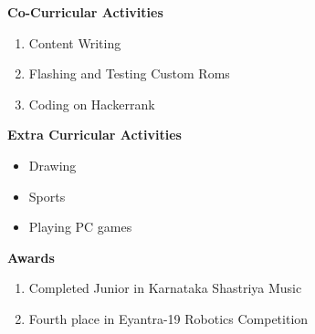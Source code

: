 \documentclass[12pt]{article}
\begin{document}
\vspace{0.1cm}
{\fontsize{14pt}{16.8pt}\selectfont \textbf{Co-Curricular Activities}\par}\par

\begin{enumerate}[label*={\fontsize{13pt}{13pt}\selectfont \arabic*.}]
	\item {\fontsize{13pt}{15.6pt}\selectfont Content Writing\par}\par
	\item {\fontsize{13pt}{15.6pt}\selectfont Flashing and Testing Custom Roms\par}
	\item {\fontsize{13pt}{15.6pt}\selectfont Coding on Hackerrank\par}
\end{enumerate}\par


\vspace{1cm}
{\fontsize{14pt}{16.8pt}\selectfont \textbf{Extra Curricular Activities}\par}\par

\begin{itemize}
	\item {\fontsize{13pt}{15.6pt}\selectfont Drawing\par}\par
	\item {\fontsize{13pt}{15.6pt}\selectfont Sports\par}
	\item {\fontsize{13pt}{15.6pt}\selectfont Playing PC games\par}
\par
\end{itemize}

\vspace{0.1cm}
{\fontsize{14pt}{16.8pt}\selectfont \textbf{Awards}\par}\par
\begin{enumerate}
	\item {\fontsize{13pt}{15.6pt}\selectfont Completed Junior in Karnataka Shastriya Music\par}\par
	\item {\fontsize{13pt}{15.6pt}\selectfont Fourth place in Eyantra-19 Robotics Competition \par}\par
\end{enumerate}\par
\end{document}
